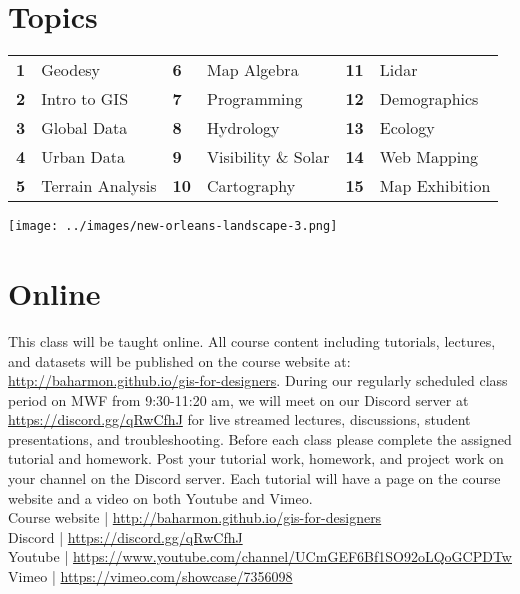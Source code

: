 \documentclass[11pt,article,oneside]{memoir}
\begin{document}
\section{Topics}

\begin{table}[H]
\begin{tabular}{l l @{\hskip 0.5cm} l l @{\hskip 0.5cm} l l}
\small
\textbf{1} & Geodesy & \textbf{6} & Map Algebra & \textbf{11} & Lidar\\
\textbf{2} & Intro to GIS & \textbf{7} & Programming & \textbf{12} & Demographics\\
\textbf{3} & Global Data & \textbf{8} & Hydrology & \textbf{13} & Ecology\\
\textbf{4} & Urban Data & \textbf{9} & Visibility \& Solar & \textbf{14} & Web Mapping\\
\textbf{5} & Terrain Analysis & \textbf{10} & Cartography & \textbf{15} & Map Exhibition\\
\end{tabular}
\end{table}

\vspace*{1em}

\texttt{[image: ../images/new-orleans-landscape-3.png]}

\clearpage

\section{Online}

This class will be taught online.
All course content including tutorials, lectures, and datasets
will be published on the course website at:
\url{http://baharmon.github.io/gis-for-designers}.
During our regularly scheduled class period on MWF from 9:30-11:20 am,
we will meet on our Discord server at \url{https://discord.gg/qRwCfhJ}
for live streamed lectures, discussions, student presentations, and troubleshooting. 
Before each class please complete the assigned tutorial and homework. 
Post your tutorial work, homework, and project work 
on your channel on the Discord server. 
Each tutorial will have a page on the course website
and a video on both Youtube and Vimeo. \\

\noindent
Course website | \url{http://baharmon.github.io/gis-for-designers}\\
Discord | \url{https://discord.gg/qRwCfhJ}\\
Youtube | \url{https://www.youtube.com/channel/UCmGEF6Bf1SO92oLQoGCPDTw}\\
Vimeo | \url{https://vimeo.com/showcase/7356098}\\
\end{document}
